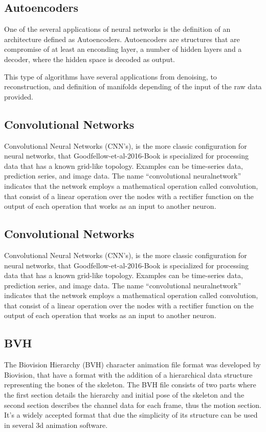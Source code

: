 \subsection{Autoencoders}  \label{subSec:Autoecoders}

One of the several applications of neural networks is the definition of an architecture defined as Autoencoders. Autoencoders are structures that are compromise of at least an enconding layer, a number of hidden layers and a decoder, where the hidden space is decoded as output.

This type of algorithms have several applications from denoising, to reconstruction, and  definition of manifolds depending of the input of the raw data provided. 

\subsection{Convolutional Networks}  \label{subSec:ConvolutionalNetworks}

\citep{Goodfellow-et-al-2016-Book:2018} Convolutional Neural Networks (CNN's), is the more classic configuration for neural networks, that {Goodfellow-et-al-2016-Book} is specialized 
for processing data that has a known grid-like topology. Examples can be time-series data, prediction series, and image data. 
The name “convolutional neuralnetwork” indicates that the network employs a mathematical operation called convolution, that consist of a linear operation 
over the nodes with a rectifier function on the output of each operation that works as an input to another neuron.

\subsection{Convolutional Networks}  \label{subSec:ConvolutionalNetworks}

Convolutional Neural Networks (CNN's), is the more classic configuration for neural networks, that {Goodfellow-et-al-2016-Book} is specialized 
for processing data that has a known grid-like topology. Examples can be time-series data, prediction series, and image data. 
The name “convolutional neuralnetwork” indicates that the network employs a mathematical operation called convolution, that consist of a linear operation 
over the nodes with a rectifier function on the output of each operation that works as an input to another neuron.

\subsection{BVH}  \label{subSec:BVH}

The Biovision Hierarchy (BVH) character animation file format was developed by Biovision,   
that \citep{hayes2013acting} have a format with the addition of a hierarchical data structure 
representing the bones of the skeleton. The BVH file consists of two parts
where the first section details the hierarchy and initial pose of the skeleton and the second section
describes the channel data for each frame, thus the motion section.
It's a widely accepted format that due the simplicity of its structure can be used in several
3d animation software.
